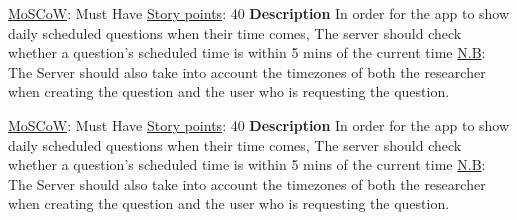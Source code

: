 \documentclass[12pt, a4paper]{report}
\begin{document}
\begin{tcolorbox}[width=\textwidth,colback={White},title={\textbf {Scheduling Weekly}},colbacktitle=grey,coltitle=black]
\underline{MoSCoW}: Must Have
\hfill
\underline {Story points}: 40
\newline
\newline
\blindtext \textbf{Description}
\newline
In order for the app to show daily scheduled questions when their time comes,\newline
The server should check whether a question's scheduled time is within 5 mins of the current time
\newline
\newline
\underline{N.B}:  The Server should also take into account the timezones of both the researcher when creating the question and the user who is requesting the question.
\end{tcolorbox}  

\vspace*{20px}

\begin{tcolorbox}[width=\textwidth,colback={White},title={\textbf {Scheduling Daily}},colbacktitle=grey,coltitle=black]
\underline{MoSCoW}: Must Have
\hfill
\underline {Story points}: 40
\newline
\newline
\blindtext \textbf{Description}
\newline
In order for the app to show daily scheduled questions when their time comes,\newline
The server should check whether a question's scheduled time is within 5 mins of the current time
\newline
\newline
\underline{N.B}:  The Server should also take into account the timezones of both the researcher when creating the question and the user who is requesting the question.
\end{tcolorbox}  

\vspace*{20px}
\end{document}
